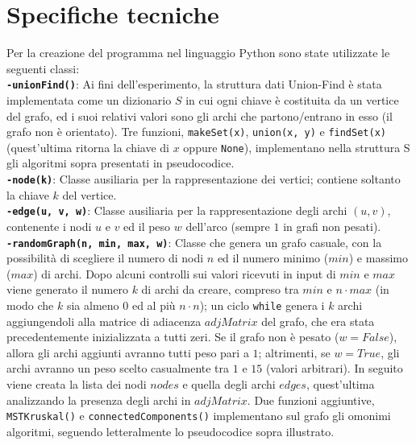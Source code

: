 \documentclass[]{article}
\def\code#1{\texttt{#1}} %
\begin{document}
\section {Specifiche tecniche}
Per la creazione del programma nel linguaggio Python sono state utilizzate le seguenti classi: \\

\code{\bf {-unionFind()}}:	Ai fini dell'esperimento, la struttura dati Union-Find è stata implementata come un dizionario $S$ in cui ogni chiave è costituita da un vertice del grafo, ed i suoi relativi valori sono gli archi che partono/entrano in esso (il grafo non è orientato). Tre funzioni, \code{makeSet(x)}, \code{union(x, y)} e \code{findSet(x)} (quest'ultima ritorna la chiave di $x$ oppure \code{None}), implementano nella struttura S gli algoritmi sopra presentati in pseudocodice. \\

\code{\bf {-node(k)}}: Classe ausiliaria per la rappresentazione dei vertici; contiene soltanto la chiave $k$ del vertice. \\

\code{\bf {-edge(u, v, w)}}: Classe ausiliaria per la rappresentazione degli archi $(u,v)$, contenente i nodi $u$ e $v$ ed il peso $w$ dell'arco (sempre $1$ in grafi non pesati). \\

\code{\bf {-randomGraph(n, min, max, w)}}: Classe che genera un grafo casuale, con la possibilità di scegliere il numero di nodi $n$ ed il numero minimo ($min$) e massimo ($max$) di archi. Dopo alcuni controlli sui valori ricevuti in input di $min$ e $max$ viene generato il numero $k$ di archi da creare, compreso tra $min$ e $n\cdot max$ (in modo che $k$ sia almeno $0$ ed al più $n\cdot n$); un ciclo \code{while} genera i $k$ archi aggiungendoli alla matrice di adiacenza $adjMatrix$ del grafo, che era stata precedentemente inizializzata a tutti zeri. Se il grafo non è pesato ($w = False$), allora gli archi aggiunti avranno tutti peso pari a $1$; altrimenti, se $w = True$, gli archi avranno un peso scelto casualmente tra $1$ e $15$ (valori arbitrari). In seguito viene creata la lista dei nodi $nodes$ e quella degli archi $edges$, quest'ultima analizzando la presenza degli archi in $adjMatrix$. Due funzioni aggiuntive, \code{MSTKruskal()} e \code{connectedComponents()} implementano sul grafo gli omonimi algoritmi, seguendo letteralmente lo pseudocodice sopra illustrato. \\
\end{document}
